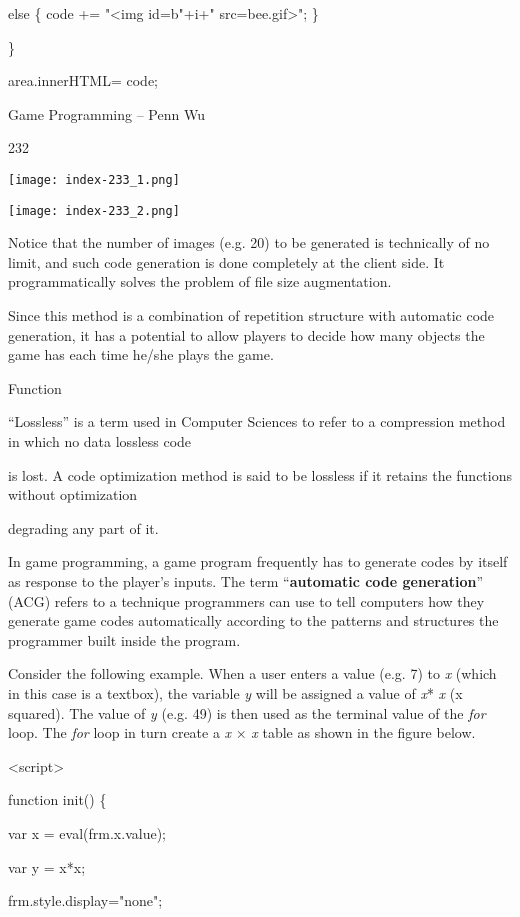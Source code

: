 \documentclass[
]{article}
\begin{document}
else \{ code += "\textless img
id=\textquotesingle b"+i+"\textquotesingle{}
src=\textquotesingle bee.gif\textquotesingle\textgreater"; \}

\}

area.innerHTML= code;

Game Programming -- Penn Wu

232

\protect\hypertarget{index_split_012.htmlux5cux23p233}{}{}\texttt{[image: index-233\_1.png]}

\texttt{[image: index-233\_2.png]}

Notice that the number of images (e.g. 20) to be generated is
technically of no limit, and such code generation is done completely at
the client side. It programmatically solves the problem of file size
augmentation.

Since this method is a combination of repetition structure with
automatic code generation, it has a potential to allow players to decide
how many objects the game has each time he/she plays the game.

Function

``Lossless'' is a term used in Computer Sciences to refer to a
compression method in which no data lossless code

is lost. A code optimization method is said to be lossless if it retains
the functions without optimization

degrading any part of it.

In game programming, a game program frequently has to generate codes by
itself as response to the player's inputs. The term ``\textbf{automatic
code generation}'' (ACG) refers to a technique programmers can use to
tell computers how they generate game codes automatically according to
the patterns and structures the programmer built inside the program.

Consider the following example. When a user enters a value (e.g. 7) to
\emph{x} (which in this case is a textbox), the variable \emph{y} will
be assigned a value of \emph{x}* \emph{x} (x squared). The value of
\emph{y} (e.g. 49) is then used as the terminal value of the \emph{for}
loop. The \emph{for} loop in turn create a \emph{x} × \emph{x} table as
shown in the figure below.

\textless script\textgreater{}

function init() \{

var x = eval(frm.x.value);

var y = x*x;

frm.style.display="none";
\end{document}
